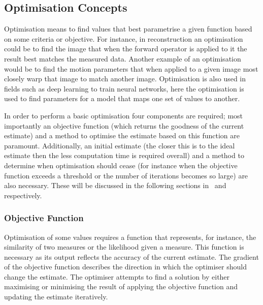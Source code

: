         \subsection{Optimisation Concepts} \label{sec:optimisation_concepts}
            Optimisation means to find values that best parametrise a given function based on some criteria or objective. %
            For instance, in reconstruction an optimisation could be to find the image that when the forward operator is applied to it the result best matches the measured data. Another example of an optimisation would be to find the motion parameters that when applied to a given image most closely warp that image to match another image. Optimisation is also used in fields such as deep learning to train neural networks, here the optimisation is used to find parameters for a model that maps one set of values to another.%
            
            In order to perform a basic optimisation four components are required; most importantly an objective function (which returns the goodness of the current estimate) and a method to optimise the estimate based on this function are paramount. Additionally, an initial estimate (the closer this is to the ideal estimate then the less computation time is required overall) and a method to determine when optimisation should cease (for instance when the objective function exceeds a threshold or the number of iterations becomes so large) are also necessary. These will be discussed in the following sections in~ and~ respectively.
        
            \subsubsection{Objective Function} \label{sec:objective_function}
                Optimisation of some values requires a function that represents, for instance, the similarity of two measures or the likelihood given a measure. This function is necessary as its output reflects the accuracy of the current estimate. The gradient of the objective function describes the direction in which the optimiser should change the estimate. The optimiser attempts to find a solution by either maximising or minimising the result of applying the objective function and updating the estimate iteratively.
                
